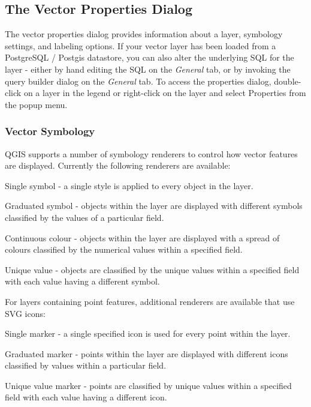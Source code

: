\documentclass[10pt,english]{article}
\begin{document}
\begin{onehalfspace}
\subsection{The Vector Properties
Dialog}\label{sec:vectorprops}
The vector properties dialog provides information about a layer, symbology
settings, and labeling options. If your vector layer has been loaded from a
PostgreSQL / Postgis datastore, you can also alter the underlying SQL for the
layer - either by hand editing the SQL on the \textit{General} tab, or by invoking the
query builder dialog on the \textit{General} tab. To access the properties dialog,
double-click on a layer in the legend or right-click on the layer and select
Properties from the popup menu.

\subsubsection{Vector Symbology}\label{sec:symbology}

QGIS supports a number of symbology renderers to control how
vector features are displayed. Currently the following renderers
are available:

\begin{compactdesc}
    \item[Single symbol] - a single style is applied to every
    object in the layer.
    \item[Graduated symbol] - objects within the layer are
    displayed with different symbols classified by the values of a
    particular field.
    \item[Continuous colour] - objects within the layer are
    displayed with a spread of colours classified by the numerical
    values within a specified field.
    \item[Unique value] - objects are classified by the unique
    values within a specified field with each value having a
    different symbol.
\end{compactdesc}

For layers containing point features, additional renderers are
available that use SVG icons:

\begin{compactdesc}
    \item[Single marker] - a single specified icon is used for
    every point within the layer.
    \item[Graduated marker] - points within the layer are
    displayed with different icons classified by values within a
    particular field.
    \item[Unique value marker] - points are classified by unique
    values within a specified field with each value having a
    different icon.
\end{compactdesc}


\end{onehalfspace}
\end{document}

